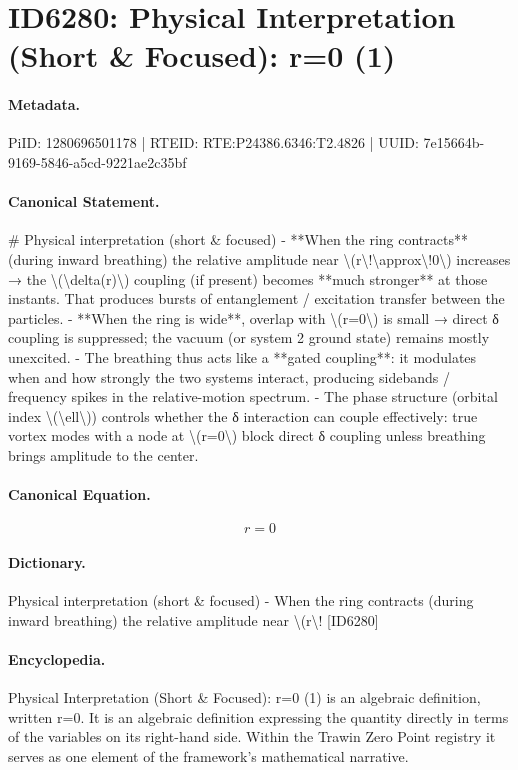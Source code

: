 \section*{ID6280: Physical Interpretation (Short \& Focused): r=0 (1)}
\paragraph{Metadata.}
PiID: 1280696501178 | RTEID: RTE:P24386.6346:T2.4826 | UUID: 7e15664b-9169-5846-a5cd-9221ae2c35bf

\paragraph{Canonical Statement.}
\# Physical interpretation (short \& focused) - **When the ring contracts** (during inward breathing) the relative amplitude near \textbackslash{}(r\textbackslash{}!\textbackslash{}approx\textbackslash{}!0\textbackslash{}) increases → the \textbackslash{}(\textbackslash{}delta(r)\textbackslash{}) coupling (if present) becomes **much stronger** at those instants. That produces bursts of entanglement / excitation transfer between the particles. - **When the ring is wide**, overlap with \textbackslash{}(r=0\textbackslash{}) is small → direct δ coupling is suppressed; the vacuum (or system 2 ground state) remains mostly unexcited. - The breathing thus acts like a **gated coupling**: it modulates when and how strongly the two systems interact, producing sidebands / frequency spikes in the relative-motion spectrum. - The phase structure (orbital index \textbackslash{}(\textbackslash{}ell\textbackslash{})) controls whether the δ interaction can couple effectively: true vortex modes with a node at \textbackslash{}(r=0\textbackslash{}) block direct δ coupling unless breathing brings amplitude to the center.

\paragraph{Canonical Equation.}
\[
r=0
\]

\paragraph{Dictionary.}
Physical interpretation (short \& focused) - When the ring contracts (during inward breathing) the relative amplitude near \textbackslash{}(r\textbackslash{}! [ID6280]

\paragraph{Encyclopedia.}
Physical Interpretation (Short \& Focused): r=0 (1) is an algebraic definition, written r=0. It is an algebraic definition expressing the quantity directly in terms of the variables on its right-hand side. Within the Trawin Zero Point registry it serves as one element of the framework's mathematical narrative.
